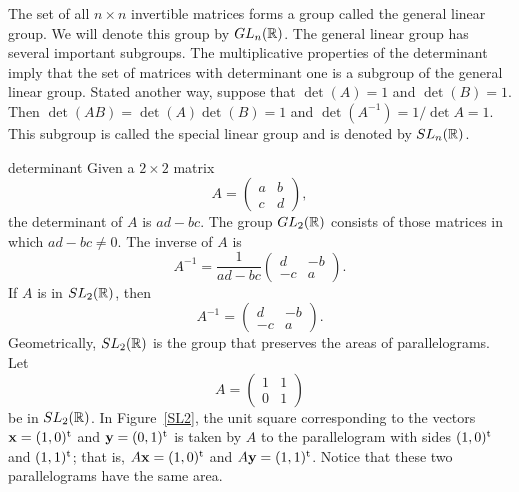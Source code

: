 The set of all $n \times n$  invertible matrices forms a group called
the {\bfi general linear group}.  We will
denote this group by $GL_n({\Bbb R})$.  The general linear group has
several important subgroups. The multiplicative properties of the
determinant imply that the set of matrices with determinant one is a
subgroup of the general linear group.  Stated another way, suppose
that $\det(A) =1$ and $\det(B) = 1$. Then $\det(AB) = \det(A) \det (B)
= 1$ and $\det(A^{-1}) = 1 / \det A = 1$. This subgroup is called the
{\bfi special linear group\/} and is
denoted by $SL_n({\Bbb R})$. 
 
 
\begin{example}{determinant}
Given a $2 \times 2$ matrix
\[
A =
\begin{pmatrix}
a & b \\
c & d
\end{pmatrix},
\]
the determinant of $A$ is \mbox{$ad-bc$}. The group $GL_2({\Bbb R})$
consists of those matrices in which $ad-bc \neq 0$. The inverse of $A$
is 
\[
A^{-1} =
\frac{1}{ad-bc}
\begin{pmatrix}
d & -b \\
-c & a
\end{pmatrix}.
\]
If $A$ is in $SL_2({\Bbb R})$, then
\[
A^{-1} =
\begin{pmatrix}
d & -b \\
-c & a
\end{pmatrix}.
\]
Geometrically, $SL_2({\Bbb R})$ is the group that preserves the areas
of parallelograms.  Let 
\[
A =
\begin{pmatrix}
1 & 1 \\
0 & 1
\end{pmatrix}
\]
be in $SL_2({\Bbb R})$. In Figure~\ref{SL2}, the unit square
corresponding to the vectors ${\mathbf x} = (1,0)^{\rm t}$ and ${\mathbf
y} =  (0,1)^{\rm t}$ is taken  by $A$ to the parallelogram with sides
$(1,0)^{\rm t}$ and $(1, 1)^{\rm t}$; that is, $A {\mathbf x} =
(1,0)^{\rm t}$ and $A {\mathbf y} = (1, 1)^{\rm t}$. Notice that these
two parallelograms have the same area.   
\end{example}
 
